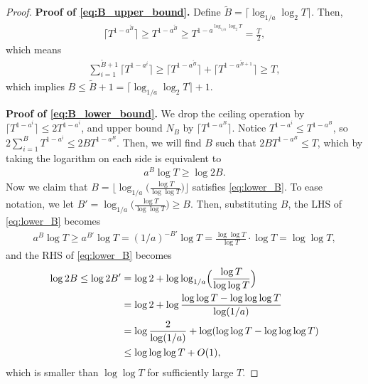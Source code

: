 \documentclass[10pt]{article}
\begin{document}
\begin{proof}
    \textbf{Proof of \eqref{eq:B_upper_bound}.} 
    Define 
    $\tilde{B} = \lceil \log_{1/a}\log_2 T \rceil$. Then,
    \begin{align}
        \lceil T^{1-a^{\tilde{B}}} \rceil
        \geq T^{1-a^{\tilde{B}}}
        \geq T^{1-a^{\log_{1/a}\log_2 T}}
        = \frac{T}{2},
    \end{align}
    which means
    \begin{align}
        \sum_{i=1}^{\tilde{B}+1} \lceil T^{1-a^{i}} \rceil 
        \geq \lceil T^{1-a^{\tilde{B}}} \rceil + \lceil T^{1-a^{\tilde{B}+1}} \rceil 
        \geq T,
    \end{align}
    which implies $B\leq \tilde{B}+1 = \lceil \log_{1/a}\log_2 T \rceil + 1 $.
    
    \textbf{Proof of \eqref{eq:B_lower_bound}.} We drop the ceiling operation by $\lceil T^{1-a^i} \rceil \leq 2 T^{1-a^i}$, and upper bound $N_{B} $ by $\lceil T^{1-a^{B}} \rceil$.
    Notice $T^{1-a^i} \leq T^{1-a^{B}} $, so $2 \sum_{i=1}^{B} T^{1-a^i} \leq 2 B T^{1-a^{B}}  $. 
    Then, we will find $B$ such that $2 B T^{1-a^{B}} \leq T$, which by taking the logarithm on each side is equivalent to
    \begin{align}
        a^{B}\log T\geq \log 2B. \label{eq:lower_B}
    \end{align}
    Now we claim that $B = \bigl\lfloor \log_{1/a}\bigl(\frac{\log T}{\log\log T}\bigr) \bigr\rfloor$ satisfies \eqref{eq:lower_B}. To ease notation, we let $B' = \log_{1/a}\bigl(\frac{\log T}{\log\log T}\bigr) \geq B$. Then, substituting $B$, the LHS of \eqref{eq:lower_B} becomes
    \begin{align}
        a^{B}\log T
        \geq a^{B'}\log T
        = (1/a)^{-B'}\log T
        = \frac{\log \log T}{\log T}\cdot \log T
        = \log\log T,
    \end{align}
    and the RHS of \eqref{eq:lower_B} becomes
    \begin{align}
        \log 2B
        \leq \log 2B'
        & = \log 2 + \log\log_{1/a}\Bigl(\frac{\log T}{\log\log T}\Bigr) \\
        & = \log 2 + \log \frac{\log\log T - \log\log\log T}{\log (1/a)} \\
        & = \log \frac{2}{\log(1/a)} + \log (\log\log T - \log\log\log T) \\
        & \leq \log\log\log T + O(1),
    \end{align}
    which is smaller than $\log\log T$ for sufficiently large $T$. 
\end{proof}
\end{document}
